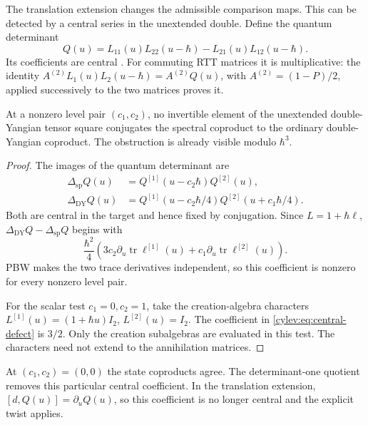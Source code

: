 The translation extension changes the admissible comparison maps.
This can be detected by a central series in the unextended double.
Define the quantum determinant
\begin{equation}\label{cylev:eq:determinant}
 Q(u)=L_{11}(u)L_{22}(u-\hbar)-L_{21}(u)L_{12}(u-\hbar).
\end{equation}
Its coefficients are central
\cite[Proposition~2.8]{JingKozicMolevYang2017}.
For commuting RTT matrices it is multiplicative: the identity
$A^{(2)}L_1(u)L_2(u-\hbar)=A^{(2)}Q(u)$, with
$A^{(2)}=(1-P)/2$, applied successively to the two matrices proves it.

\begin{proposition}\label{cylev:prop:central-obstruction}
At a nonzero level pair $(c_1,c_2)$, no invertible element of the
unextended double-Yangian tensor square conjugates the spectral
coproduct to the ordinary double-Yangian coproduct.
The obstruction is already visible modulo $\hbar^3$.
\end{proposition}
\begin{proof}
The images of the quantum determinant are
\begin{align*}
 \Delta_{\mathrm{sp}}Q(u)&=Q^{[1]}(u-c_2\hbar)Q^{[2]}(u),\\
 \Delta_{\mathrm{DY}}Q(u)&=Q^{[1]}(u-c_2\hbar/4)
                                  Q^{[2]}(u+c_1\hbar/4).
\end{align*}
Both are central in the target and hence fixed by conjugation.
Since $L=1+\hbar\ell$,
$\Delta_{\mathrm{DY}}Q-\Delta_{\mathrm{sp}}Q$ begins with
\begin{equation}\label{cylev:eq:central-defect}
 \frac{\hbar^2}{4}
 \left(3c_2\partial_u\operatorname{tr}\ell^{[1]}(u)
          +c_1\partial_u\operatorname{tr}\ell^{[2]}(u)\right).
\end{equation}
PBW makes the two trace derivatives independent, so this coefficient
is nonzero for every nonzero level pair.

For the scalar test $c_1=0,c_2=1$, take the creation-algebra characters
$L^{[1]}(u)=(1+\hbar u)I_2$, $L^{[2]}(u)=I_2$.
The coefficient in \eqref{cylev:eq:central-defect} is $3/2$.
Only the creation subalgebras are evaluated in this test. The
characters need not extend to the annihilation matrices.
\end{proof}

At $(c_1,c_2)=(0,0)$ the state coproducts agree.
The determinant-one quotient removes this particular central coefficient.
In the translation extension, $[d,Q(u)]=\partial_uQ(u)$,
so this coefficient is no longer central and the explicit twist applies.

